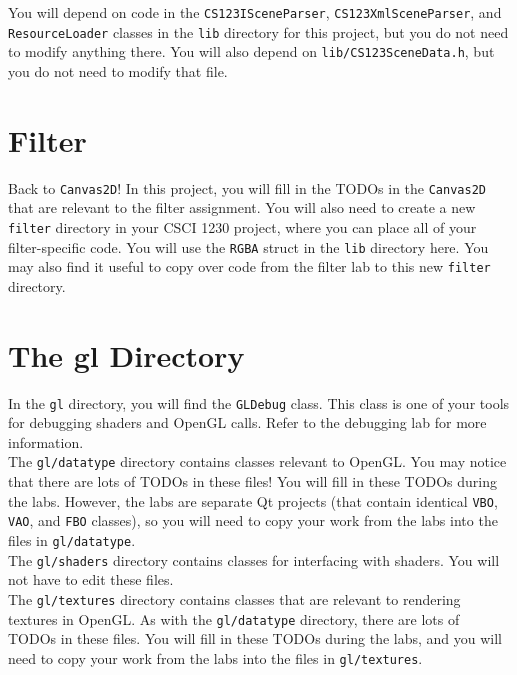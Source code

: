 \documentclass[landscape,twocolumn,letterpaper]{article}
\begin{document}
\noindent
You will depend on code in the  \texttt{CS123ISceneParser},
\texttt{CS123XmlSceneParser}, and \texttt{ResourceLoader} classes in the \texttt{lib} directory for this project, but you do not need to modify anything there. You will also depend on \texttt{lib/CS123SceneData.h}, but you do not need to modify that file.

\section{Filter}

\noindent
Back to \texttt{Canvas2D}! In this project, you will fill in the TODOs in the \texttt{Canvas2D} that are relevant to the filter assignment. You will also need to create a new \texttt{filter} directory in your CSCI 1230 project, where you can place all of your filter-specific code. You will use the \texttt{RGBA} struct in the \texttt{lib} directory here. You may also find it useful to copy over code from the filter lab to this new \texttt{filter} directory. \\

\section{The gl Directory}

In the \texttt{gl} directory, you will find the \texttt{GLDebug} class. This class is one of your tools for debugging shaders and OpenGL calls. Refer to the debugging lab for more information.\\

\noindent
The \texttt{gl/datatype} directory contains classes relevant to OpenGL. You may notice that there are lots of TODOs in these files! You will fill in these TODOs during the labs. However, the labs are separate Qt projects (that contain identical \texttt{VBO}, \texttt{VAO}, and \texttt{FBO} classes), so you will need to copy your work from the labs into the files in \texttt{gl/datatype}.\\

\noindent
The \texttt{gl/shaders} directory contains classes for interfacing with shaders. You will not have to edit these files. \\

\noindent
The \texttt{gl/textures} directory contains classes that are relevant to rendering textures in OpenGL. As with the \texttt{gl/datatype} directory, there are lots of TODOs in these files. You will fill in these TODOs during the labs, and you will need to copy your work from the labs into the files in \texttt{gl/textures}.\\
\end{document}
